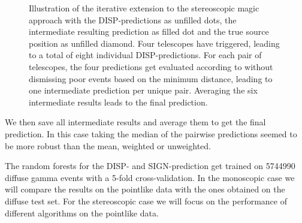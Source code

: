 \begin{figure}
\begin{subfigure}{0.45\textwidth}
    \end{subfigure}
    \caption{
    Illustration of the iterative extension to the stereoscopic magic approach
    with the DISP-predictions as unfilled dots, the intermediate resulting prediction
    as filled dot and the true source position as unfilled diamond.
    Four telescopes have triggered, leading to a total of eight individual DISP-predictions.
    For each pair of telescopes, the four predictions get evaluated according to \cite{ALEKSIC201676}
    without dismissing poor events based on the minimum distance, leading to one 
    intermediate prediction per unique pair.
    Averaging the six intermediate results leads to the final prediction.}
    \label{fig:stereo_disp}
\end{figure}

We then save all intermediate results and average them to get the final prediction.
In this case taking the median of the pairwise predictions seemed to be more robust
than the mean, weighted or unweighted.

The random forests for the DISP- and SIGN-prediction get trained on
5744990 diffuse gamma events with a 5-fold cross-validation.
In the monoscopic case we will compare the results on the pointlike data with the 
ones obtained on the diffuse test set.
For the stereoscopic case we will focus on the performance of different algorithms on the
pointlike data. 

